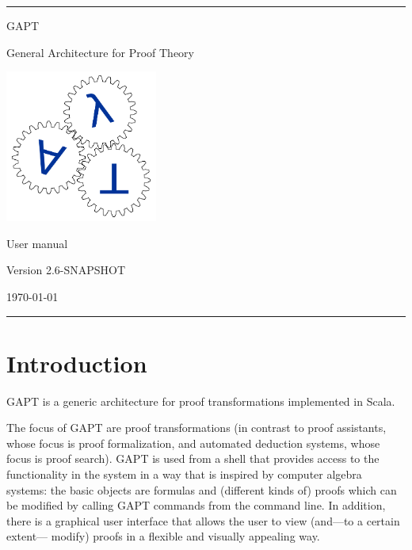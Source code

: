 \documentclass[a4paper,11pt]{article}
\begin{document}
\begin{titlepage}
\begin{center}

\hrule

\vspace*{20mm}

{\Huge GAPT}

\vspace*{5mm}

{\huge General Architecture for Proof Theory}

\vspace*{20mm}

\includegraphics[keepaspectratio,width=5cm]{logo}

\vspace*{20mm}

{\Huge User manual}

\vspace*{10mm}
{\Large Version 2.6-SNAPSHOT}
\vspace*{10mm}

{\Large \today}

\vspace*{20mm}

\hrule
\end{center}

\end{titlepage}

\listoffixmes

\tableofcontents
\vfill
\pagebreak

\section{Introduction}

GAPT is a generic architecture for proof transformations implemented in Scala.

The focus of GAPT are proof transformations (in contrast to proof assistants,
whose focus is proof formalization, and automated deduction systems, whose focus
is proof search). GAPT is used from a shell that provides access to the functionality
in the system in a way that is inspired by computer algebra systems: the basic
objects are formulas and (different kinds of) proofs which can be modified
by calling GAPT commands from the command line. In addition, there
is a graphical user interface that allows the user to view (and—to a certain extent—
modify) proofs in a flexible and visually appealing way.
\end{document}

